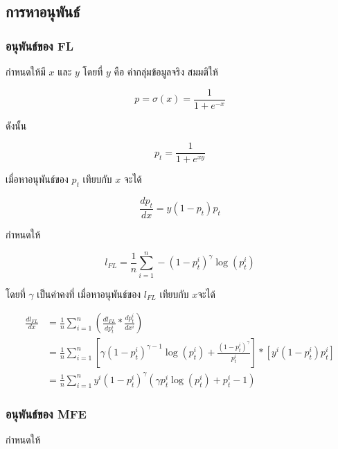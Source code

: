 \subsection{การหาอนุพันธ์}

\subsubsection{อนุพันธ์ของ FL}
กำหนดให้มี $x$ และ $y$ โดยที่ $y$ คือ ค่ากลุ่มข้อมูลจริง สมมติให้

\begin{equation}
	p = \sigma (x) = \frac{1}{1 + e^{-x}}
\end{equation}

ดังนั้น

\begin{equation}
	p_{t} = \frac{1}{1 + e^{xy}}
\end{equation}

เมื่อหาอนุพันธ์ของ $p_{t}$ เทียบกับ $x$ จะได้

\begin{equation}
\frac{dp_{t}}{dx} = y(1 - p_{t})p_{t}
\end{equation}

กำหนดให้

\begin{equation}
    l_{FL} = \frac{1}{n} \sum_{i = 1}^{n} - (1 - p_{t}^{i})^{\gamma}\log (p_{t}^{i})
\end{equation}

โดยที่ $\gamma$ เป็นค่าคงที่ เมื่อหาอนุพันธ์ของ $l_{FL}$ เทียบกับ $x$จะได้

\begin{equation}
\begin{split}
\frac{dl_{FL}}{dx} & = \frac{1}{n} \sum_{i = 1}^{n} (\frac{dl_{FL}}{dp_{t}^{i}} * \frac{dp_{t}^{i}}{dx^{i}}) \\
& =\frac{1}{n} \sum_{i = 1}^{n} [\gamma (1 - p_{t}^{i})^{\gamma - 1} \log (p_{t}^{i}) + \frac{(1 - p_{t}^{i})^{\gamma}}{p_{t}^{i}}] * [y^{i}(1 - p_{t}^{i})p_{t}^{i}]  \\
& = \frac{1}{n} \sum_{i = 1}^{n} y^{i} (1 - p_{t}^{i})^{\gamma} (\gamma p_{t}^{i} \log (p_{t}^{i}) + p_{t}^{i} - 1)
\end{split}
\end{equation}

\subsubsection{อนุพันธ์ของ MFE}
กำหนดให้


